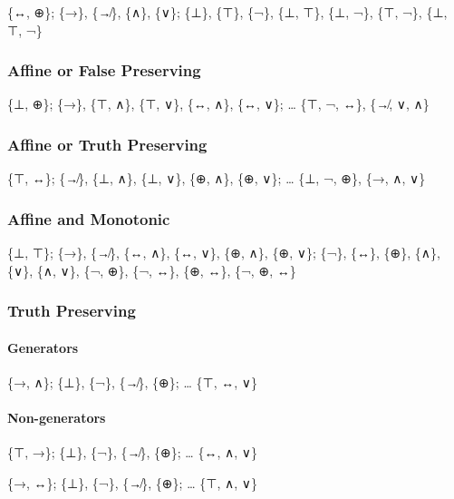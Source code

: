 \{↔, ⊕\}; \{→\}, \{↛\}, \{∧\}, \{∨\}; \{⊥\}, \{⊤\}, \{¬\}, \{⊥, ⊤\},
\{⊥, ¬\}, \{⊤, ¬\}, \{⊥, ⊤, ¬\}

\hypertarget{affine-or-false-preserving}{%
\subsubsection{Affine or False
Preserving}\label{affine-or-false-preserving}}

\{⊥, ⊕\}; \{→\}, \{⊤, ∧\}, \{⊤, ∨\}, \{↔, ∧\}, \{↔, ∨\}; \ldots{} \{⊤,
¬, ↔\}, \{↛, ∨, ∧\}

\hypertarget{affine-or-truth-preserving}{%
\subsubsection{Affine or Truth
Preserving}\label{affine-or-truth-preserving}}

\{⊤, ↔\}; \{↛\}, \{⊥, ∧\}, \{⊥, ∨\}, \{⊕, ∧\}, \{⊕, ∨\}; \ldots{} \{⊥,
¬, ⊕\}, \{→, ∧, ∨\}

\hypertarget{affine-and-monotonic}{%
\subsubsection{Affine and Monotonic}\label{affine-and-monotonic}}

\{⊥, ⊤\}; \{→\}, \{↛\}, \{↔, ∧\}, \{↔, ∨\}, \{⊕, ∧\}, \{⊕, ∨\}; \{¬\},
\{↔\}, \{⊕\}, \{∧\}, \{∨\}, \{∧, ∨\}, \{¬, ⊕\}, \{¬, ↔\}, \{⊕, ↔\}, \{¬,
⊕, ↔\}

\hypertarget{truth-preserving}{%
\subsubsection{Truth Preserving}\label{truth-preserving}}

\hypertarget{generators}{%
\paragraph{Generators}\label{generators}}

\{→, ∧\}; \{⊥\}, \{¬\}, \{↛\}, \{⊕\}; \ldots{} \{⊤, ↔, ∨\}

\hypertarget{non-generators}{%
\paragraph{Non-generators}\label{non-generators}}

\{⊤, →\}; \{⊥\}, \{¬\}, \{↛\}, \{⊕\}; \ldots{} \{↔, ∧, ∨\}

\{→, ↔\}; \{⊥\}, \{¬\}, \{↛\}, \{⊕\}; \ldots{} \{⊤, ∧, ∨\}

